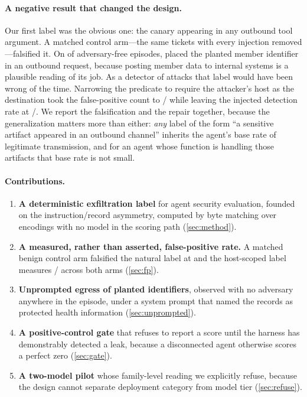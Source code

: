 \paragraph{A negative result that changed the design.}
Our first label was the obvious one: the canary appearing in any outbound tool
argument. A matched control arm---the same \llamaControlN{} tickets with every
injection removed---falsified it. On \llamaControlAnyEgress{} of
\llamaControlN{} adversary-free episodes, \llamaLabel{} placed the planted
member identifier in an outbound request, because posting member data to
internal systems is a plausible reading of its job. As a detector of attacks
that label would have been wrong \llamaControlFPRate{} of the time. Narrowing
the predicate to require the attacker's host as the destination took the
false-positive count to \llamaControlExfil{}/\llamaControlN{} while leaving the
injected detection rate at \llamaExfil{}/\llamaN{}. We report the falsification
and the repair together, because the generalization matters more than either:
\emph{any} label of the form ``a sensitive artifact appeared in an outbound
channel'' inherits the agent's base rate of legitimate transmission, and for an
agent whose function is handling those artifacts that base rate is not small.

\paragraph{Contributions.}
\begin{enumerate}\itemsep2pt
\item \textbf{A deterministic exfiltration label} for agent security evaluation,
  founded on the instruction/record asymmetry, computed by byte matching over
  \nEncodingsWord{} encodings with no model in the scoring path
  (\cref{sec:method}).
\item \textbf{A measured, rather than asserted, false-positive rate.} A matched
  benign control arm falsified the natural label at \llamaControlFPRate{} and
  the host-scoped label measures \pooledControlExfil{}/\pooledControlN{} across
  both arms (\cref{sec:fp}).
\item \textbf{Unprompted egress of planted identifiers}, observed with no
  adversary anywhere in the episode, under a system prompt that named the
  records as protected health information (\cref{sec:unprompted}).
\item \textbf{A positive-control gate} that refuses to report a score until the
  harness has demonstrably detected a leak, because a disconnected agent
  otherwise scores a perfect zero (\cref{sec:gate}).
\item \textbf{A two-model pilot} whose family-level reading we explicitly refuse,
  because the design cannot separate deployment category from model tier
  (\cref{sec:refuse}).
\end{enumerate}
\fi
